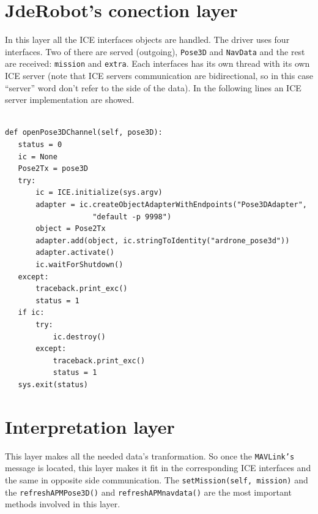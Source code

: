 \section{JdeRobot's conection layer}
\label{sec:apm_jderobot_comunication}

In this layer all the ICE interfaces objects are handled. The driver uses four interfaces. Two of there are served (outgoing), \texttt{Pose3D} and \texttt{NavData} and the rest are received: \texttt{mission} and \texttt{extra}.
Each interfaces has its own thread with its own ICE server (note that ICE servers communication are bidirectional, so in this case ``server'' word don't refer to the side of the data).
In the following lines an ICE server implementation are showed.
{\scriptsize
\begin{lstlisting}

def openPose3DChannel(self, pose3D):
   status = 0
   ic = None
   Pose2Tx = pose3D
   try:
       ic = ICE.initialize(sys.argv)
       adapter = ic.createObjectAdapterWithEndpoints("Pose3DAdapter", 
       				"default -p 9998")
       object = Pose2Tx
       adapter.add(object, ic.stringToIdentity("ardrone_pose3d")) 
       adapter.activate()
       ic.waitForShutdown()
   except:
       traceback.print_exc()
       status = 1
   if ic:
       try:
           ic.destroy()
       except:
           traceback.print_exc()
           status = 1
   sys.exit(status)
\end{lstlisting}}

\section*{Interpretation layer}
\label{interpretation_layer}

This layer makes all the needed data's tranformation. So once the \texttt{MAVLink's} message is located, this layer makes it fit in the corresponding ICE interfaces and the same in opposite side communication. 
The \texttt{setMission(self, mission)} and the \texttt{refreshAPMPose3D()} and
\texttt{refreshAPMnavdata()} are the most important methods involved in this layer.


